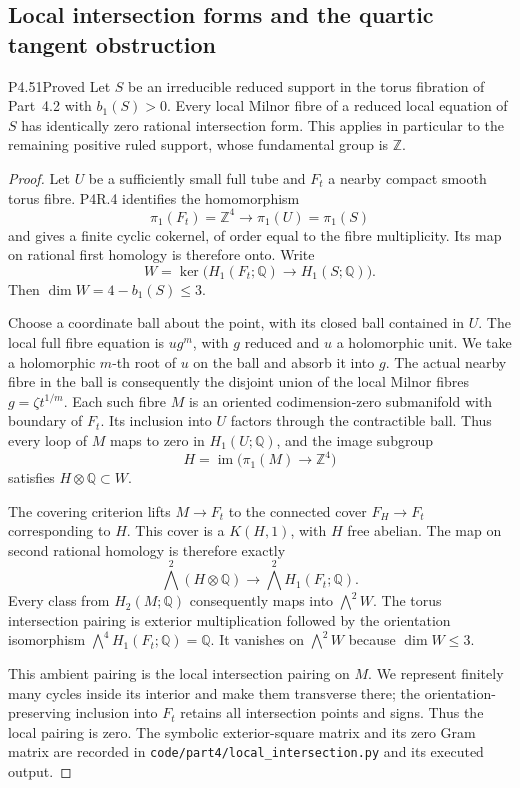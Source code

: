 \subsection{Local intersection forms and the quartic tangent obstruction}

\begin{statement}{P4.51}{Proved}
Let $S$ be an irreducible reduced support in the torus
fibration of Part~4.2 with $b_1(S)>0$. Every local
Milnor fibre of a reduced local equation of $S$ has
identically zero rational intersection form. This applies
in particular to the remaining positive ruled support,
whose fundamental group is $\mathbb Z$.
\end{statement}
\begin{proof}
Let $U$ be a sufficiently small full tube and $F_t$ a
nearby compact smooth torus fibre. P4R.4 identifies the
homomorphism
\[
 \pi_1(F_t)=\mathbb Z^4\longrightarrow
 \pi_1(U)=\pi_1(S)
\]
and gives a finite cyclic cokernel, of order equal to
the fibre multiplicity. Its map on rational first
homology is therefore onto. Write
\[
 W=\ker\bigl(H_1(F_t;\mathbb Q)\longrightarrow
                  H_1(S;\mathbb Q)\bigr).
\]
Then $\dim W=4-b_1(S)\le3$.

Choose a coordinate ball about the point, with its
closed ball contained in $U$. The local full fibre
equation is $u g^m$, with $g$ reduced and $u$ a
holomorphic unit. We take a holomorphic $m$-th root of
$u$ on the ball and absorb it into $g$. The actual
nearby fibre in the ball is consequently the disjoint
union of the local Milnor fibres
$g=\zeta t^{1/m}$. Each such fibre $M$ is an oriented
codimension-zero submanifold with boundary of $F_t$.
Its inclusion into $U$ factors through the contractible
ball. Thus every loop of $M$ maps to zero in
$H_1(U;\mathbb Q)$, and the image subgroup
\[
 H=\operatorname{im}\bigl(\pi_1(M)\longrightarrow
                                 \mathbb Z^4\bigr)
\]
satisfies $H\otimes\mathbb Q\subset W$.

The covering criterion lifts $M\to F_t$ to the
connected cover $F_H\to F_t$ corresponding to $H$.
This cover is a $K(H,1)$, with $H$ free abelian. The
map on second rational homology is therefore exactly
\[
 \bigwedge^2(H\otimes\mathbb Q)\longrightarrow
              \bigwedge^2 H_1(F_t;\mathbb Q).
\]
Every class from $H_2(M;\mathbb Q)$ consequently maps
into $\bigwedge^2W$. The torus intersection pairing is
exterior multiplication followed by the orientation
isomorphism $\bigwedge^4H_1(F_t;\mathbb Q)=\mathbb Q$.
It vanishes on $\bigwedge^2W$ because $\dim W\le3$.

This ambient pairing is the local intersection
pairing on $M$. We represent finitely many cycles
inside its interior and make them transverse there;
the orientation-preserving inclusion into $F_t$
retains all intersection points and signs. Thus the
local pairing is zero. The symbolic exterior-square
matrix and its zero Gram matrix are recorded in
\texttt{code/part4/local\_intersection.py} and its
executed output.
\end{proof}

